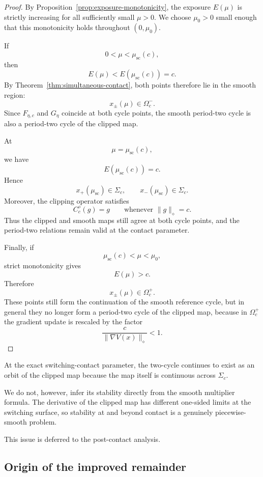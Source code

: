 \begin{proof}
By Proposition~\ref{prop:exposure-monotonicity},
the exposure $E(\mu)$ is strictly increasing for all
sufficiently small $\mu>0$. We choose $\mu_0>0$ small enough
that this monotonicity holds throughout $(0,\mu_0)$.

If
\[
0<\mu<\mu_{\mathrm{sc}}(c),
\]
then
\[
E(\mu)<E(\mu_{\mathrm{sc}}(c))=c.
\]
By Theorem~\ref{thm:simultaneous-contact},
both points therefore lie in the smooth region:
\[
x_\pm(\mu)\in\Omega_c^-.
\]
Since $F_{\eta,c}$ and $G_\eta$ coincide at both cycle points,
the smooth period-two cycle is also a period-two cycle of the
clipped map.

At
\[
\mu=\mu_{\mathrm{sc}}(c),
\]
we have
\[
E(\mu_{\mathrm{sc}}(c))=c.
\]
Hence
\[
x_+(\mu_{\mathrm{sc}})\in\Sigma_c,
\qquad
x_-(\mu_{\mathrm{sc}})\in\Sigma_c.
\]
Moreover, the clipping operator satisfies
\[
C_c^\diamond(g)=g
\qquad
\text{whenever }
\|g\|_\diamond=c.
\]
Thus the clipped and smooth maps still agree at both cycle
points, and the period-two relations remain valid at the
contact parameter.

Finally, if
\[
\mu_{\mathrm{sc}}(c)<\mu<\mu_0,
\]
strict monotonicity gives
\[
E(\mu)>c.
\]
Therefore
\[
x_\pm(\mu)\in\Omega_c^+.
\]
These points still form the continuation of the smooth reference
cycle, but in general they no longer form a period-two cycle of
the clipped map, because in $\Omega_c^+$ the gradient update is
rescaled by the factor
\[
\frac{c}{\|\nabla V(x)\|_\diamond}<1.
\]
\end{proof}

\begin{remark}
\label{rem:contact-stability-not-claimed}
At the exact switching-contact parameter, the two-cycle continues
to exist as an orbit of the clipped map because the map itself is
continuous across $\Sigma_c$.

We do not, however, infer its stability directly from the smooth
multiplier formula. The derivative of the clipped map has different
one-sided limits at the switching surface, so stability at and
beyond contact is a genuinely piecewise-smooth problem.

This issue is deferred to the post-contact analysis.
\end{remark}
\subsection{Origin of the improved remainder}
\label{subsec:origin-improved-remainder}

